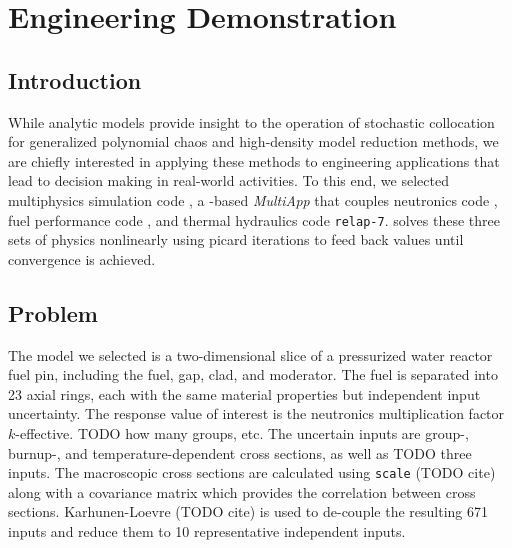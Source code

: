 
\chapter{Engineering Demonstration} %

\label{Chapter5} %



\section{Introduction}
While analytic models provide insight to the operation of stochastic collocation for generalized polynomial chaos and high-density
model reduction methods, we are chiefly interested in applying these methods to engineering applications that lead to
decision making in real-world activities.  To this end, we selected multiphysics simulation code \mammoth{}, a \moose{}-based
\emph{MultiApp} that couples neutronics code \rattlesnake{}, fuel performance code \bison{}, and thermal hydraulics code
\texttt{relap-7}.  \mammoth{} solves these three sets of physics nonlinearly using picard iterations to feed back values until
convergence is achieved.

\section{Problem}
The model we selected is a two-dimensional slice of a pressurized water reactor fuel pin, including the fuel, gap, clad, and
moderator.  The fuel is separated into 23 axial rings, each with the same material properties but independent input uncertainty.
The response value of interest is the neutronics multiplication factor $k$-effective.  TODO how many groups, etc.
The uncertain inputs are group-, burnup-, and temperature-dependent cross sections, as well as TODO three \bison{} inputs.
The macroscopic cross sections are calculated using \texttt{scale} (TODO cite) along with a covariance matrix which provides
the correlation between cross sections.  Karhunen-Loevre (TODO cite) is used to de-couple the resulting 671 inputs and
reduce them to 10 representative independent inputs.

